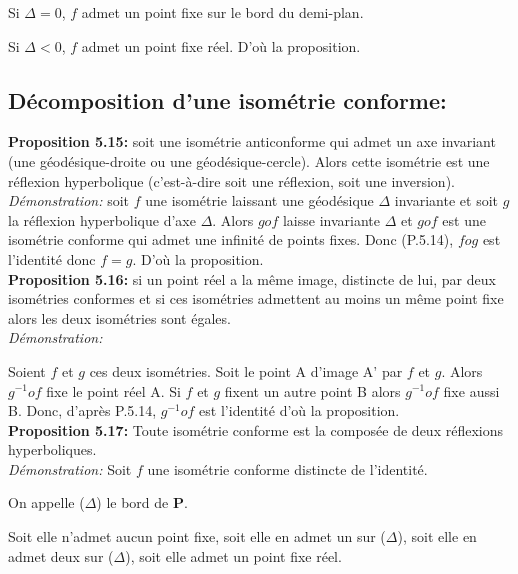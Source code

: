 \documentclass[a4paper, 12pt, twoside]{book}
\begin{document}
Si $\Delta=0$, $f$ admet un point fixe sur le bord du demi-plan.\

Si $\Delta<0$, $f$ admet un point fixe réel. D'où la proposition.\\




\subsection{Décomposition d'une isométrie conforme:}

\textbf{Proposition 5.15:} soit une isométrie anticonforme qui admet un axe invariant (une géodésique-droite ou une géodésique-cercle). Alors cette isométrie est une réflexion hyperbolique (c'est-à-dire soit une réflexion, soit une inversion).\\

\textit{Démonstration:} soit $f$ une isométrie laissant une géodésique $\Delta$ invariante et soit $g$ la réflexion hyperbolique d'axe $\Delta$. Alors $gof$ laisse invariante $\Delta$ et $gof$ est une isométrie conforme qui admet une infinité de points fixes. Donc (P.5.14), $fog$ est l'identité donc $f=g$. D'où la proposition.\\

\textbf{Proposition 5.16:} si un point réel a la même image, distincte de lui, par deux isométries conformes et si ces isométries admettent au moins un même point fixe  alors les deux isométries sont égales.\\

\textit{Démonstration:}\

Soient $f$ et $g$ ces deux isométries. Soit le point A d'image A' par $f$ et $g$. Alors $g^{-1}of$ fixe le point réel A. Si $f$ et $g$ fixent un autre point B alors $g^{-1}of$ fixe aussi B. Donc, d'après P.5.14, $g^{-1}of$ est l'identité d'où la proposition.\\

  

 \textbf{Proposition 5.17:} Toute isométrie conforme est la composée de deux réflexions hyperboliques.\\
 
 \textit{Démonstration:} Soit $f$ une isométrie conforme distincte de l'identité. \
 
 On appelle ($\Delta$) le bord de \textbf{P}.\
 
 Soit elle n'admet aucun point fixe, soit elle en admet un sur ($\Delta$), soit elle en admet deux sur ($\Delta$), soit elle admet un point fixe réel.\\
 
\end{document}
